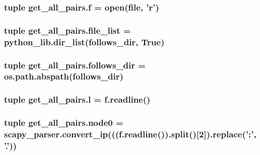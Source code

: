 \hypertarget{namespaceget__all__pairs_ab7236e4617b75a4400777ac08f262963}{
\subsubsection[{f}]{\setlength{\rightskip}{0pt plus 5cm}tuple get\-\_\-all\-\_\-pairs.\-f = open(file, 'r')}}\label{namespaceget__all__pairs_ab7236e4617b75a4400777ac08f262963}
\hypertarget{namespaceget__all__pairs_ada0a4d6ed4e95218db6dcc5a8291b97a}{
\subsubsection[{file\-\_\-list}]{\setlength{\rightskip}{0pt plus 5cm}tuple get\-\_\-all\-\_\-pairs.\-file\-\_\-list = {\bf python\-\_\-lib.\-dir\-\_\-list}({\bf follows\-\_\-dir}, True)}}\label{namespaceget__all__pairs_ada0a4d6ed4e95218db6dcc5a8291b97a}
\hypertarget{namespaceget__all__pairs_a1a098ebbb665e47d404618b95a8ea468}{
\subsubsection[{follows\-\_\-dir}]{\setlength{\rightskip}{0pt plus 5cm}tuple get\-\_\-all\-\_\-pairs.\-follows\-\_\-dir = os.\-path.\-abspath(follows\-\_\-dir)}}\label{namespaceget__all__pairs_a1a098ebbb665e47d404618b95a8ea468}
\hypertarget{namespaceget__all__pairs_ac36fe2b41b860b8d68de2dfc93945951}{
\subsubsection[{l}]{\setlength{\rightskip}{0pt plus 5cm}tuple get\-\_\-all\-\_\-pairs.\-l = f.\-readline()}}\label{namespaceget__all__pairs_ac36fe2b41b860b8d68de2dfc93945951}
\hypertarget{namespaceget__all__pairs_a50bcbb8a8923b9dac536e87f54f29cce}{
\subsubsection[{node0}]{\setlength{\rightskip}{0pt plus 5cm}tuple get\-\_\-all\-\_\-pairs.\-node0 = {\bf scapy\-\_\-parser.\-convert\-\_\-ip}(((f.\-readline()).split()\mbox{[}2\mbox{]}).replace('\-:', '.'))}}\label{namespaceget__all__pairs_a50bcbb8a8923b9dac536e87f54f29cce}
